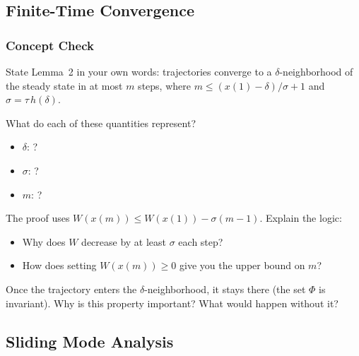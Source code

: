 \subsection{Finite-Time Convergence}

\subsubsection*{Concept Check}

State Lemma~2 in your own words: trajectories converge to a $\delta$-neighborhood of the steady state in at most $m$ steps, where $m \leq (x(1) - \delta)/\sigma + 1$ and $\sigma = \tau\,h(\delta)$.

What do each of these quantities represent?
\begin{itemize}[nosep]
  \item $\delta$: ?
  \item $\sigma$: ?
  \item $m$: ?
\end{itemize}

\begin{answerbox}\end{answerbox}

The proof uses $W(x(m)) \leq W(x(1)) - \sigma(m-1)$. Explain the logic:
\begin{itemize}[nosep]
  \item Why does $W$ decrease by at least $\sigma$ each step?
  \item How does setting $W(x(m)) \geq 0$ give you the upper bound on $m$?
\end{itemize}

\begin{largeanswer}\end{largeanswer}

Once the trajectory enters the $\delta$-neighborhood, it stays there (the set $\Phi$ is invariant). Why is this property important? What would happen without it?

\begin{answerbox}\end{answerbox}

\subsection{Sliding Mode Analysis}

